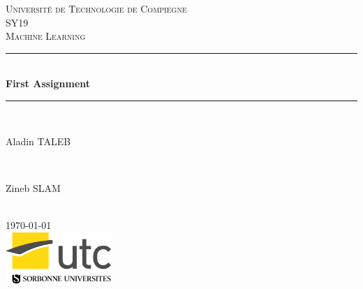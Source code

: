 \documentclass[]{report}
\begin{document}
	
\begin{titlepage}
	
	\newcommand{\HRule}{\rule{\linewidth}{0.5mm}} 
	
	\center 
	
	\textsc{\LARGE Université de Technologie de Compiegne}\\[1.5cm]
	\textsc{\Large SY19}\\[0.5cm] 
	\textsc{\large Machine Learning}\\[0.5cm]
		
	\HRule \\[0.4cm]
	{ \huge \bfseries First Assignment}\\[0.4cm] 
	\HRule \\[1.5cm]
		
	\begin{minipage}{0.4\textwidth}
		\begin{flushleft} \large
			Aladin \textsc{TALEB} 
		\end{flushleft}
	\end{minipage}
	~
	\begin{minipage}{0.4\textwidth}
		\begin{flushright} \large
			Zineb \textsc{SLAM} 
		\end{flushright}
	\end{minipage}\\[2cm]

	{\large \today}\\[2cm] 

	\includegraphics[width=40mm]{Figures/utc.jpg}\\ %

	\vfill
	
\end{titlepage}


	
\end{document}
